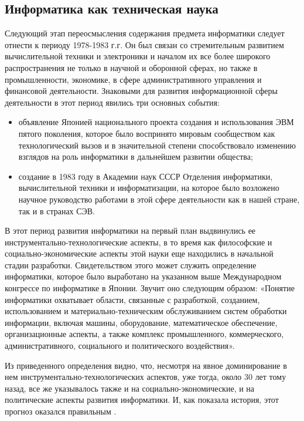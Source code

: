 \subsection{Информатика как техническая наука} \label{subsect1_2_2}

Следующий этап переосмысления содержания предмета информатики следует отнести к периоду 1978-1983 г.г. Он был связан со стремительным развитием вычислительной техники и электроники и началом их все более широкого распространения не только в научной и  оборонной сферах, но также в промышленности, экономике, в сфере административного управления и финансовой  деятельности. Знаковыми для развития информационной сферы деятельности в этот период явились три основных события: 
\begin{itemize}
 конгресс по информатике в Японии, который состоялся в 1978 году и дал новое, более широкое определение содержания термина «Информатика»;
\item объявление Японией национального проекта создания и использования ЭВМ пятого поколения, которое было воспринято мировым сообществом как технологический вызов и в значительной степени способствовало изменению взглядов на роль информатики в дальнейшем развитии общества;
\item создание в 1983 году в Академии наук СССР Отделения информатики, вычислительной техники и информатизации, на которое было возложено научное руководство работами в этой сфере деятельности как в нашей стране, так и в странах СЭВ.
\end{itemize}
         В этот период развития информатики на первый план выдвинулись ее инструментально-технологические аспекты, в то время как философские и социально-экономические аспекты этой науки еще находились в начальной стадии разработки. Свидетельством этого может служить определение информатики, которое было выработано на указанном выше Международном конгрессе по информатике в Японии. Звучит оно следующим образом: «Понятие информатики охватывает области, связанные с разработкой, созданием, использованием и материально-техническим обслуживанием систем обработки информации, включая машины, оборудование, математическое обеспечение, организационные аспекты, а также комплекс промышленного, коммерческого, административного, социального и политического воздействия».

Из приведенного определения видно, что, несмотря на явное доминирование в нем инструментально-технологических аспектов, уже тогда, около 30 лет тому назад, все же указывалось также и на социально-экономические, и на политические аспекты развития информатики. И, как показала история, этот прогноз оказался правильным \cite{bib201}.

